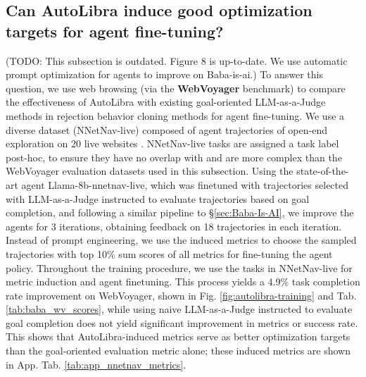 \subsection{Can AutoLibra induce good optimization targets for agent fine-tuning?}
(TODO: This subsection is outdated. Figure 8 is up-to-date. We use automatic prompt optimization for agents to improve on Baba-is-ai.)
\label{sec:webvoyager} To answer this question, we use web browsing (via the \textbf{WebVoyager}
\citep{he2024webvoyager} benchmark) to compare the effectiveness of AutoLibra
with existing goal-oriented LLM-as-a-Judge methods in rejection behavior cloning
methods for agent fine-tuning. We use a diverse dataset (NNetNav-live) composed of
agent trajectories of open-end exploration on 20 live websites \citep{Murty2025NNetNav}.
NNetNav-live tasks are assigned a task label post-hoc, to ensure they have no
overlap with and are more complex than the WebVoyager evaluation datasets used
in this subsection. Using the state-of-the-art agent Llama-8b-nnetnav-live,
which was finetuned with trajectories selected with LLM-as-a-Judge instructed to
evaluate trajectories based on goal completion, and following a similar pipeline
to \S\ref{sec:Baba-Is-AI}, we improve the agents for 3 iterations, obtaining
feedback on 18 trajectories in each iteration. Instead of prompt engineering, we
use the induced metrics to choose the sampled trajectories with top 10\% sum scores
of all metrics for fine-tuning the agent policy. Throughout the training
procedure, we use the tasks in NNetNav-live \citep{Murty2025NNetNav} for metric
induction and agent finetuning. This process yields a 4.9\% task completion rate
improvement on WebVoyager, shown in Fig. \ref{fig:autolibra-training}  and Tab. \ref{tab:baba_wv_scores},
while using naive LLM-as-a-Judge instructed to evaluate goal completion does not
yield significant improvement in metrics or success rate. This shows that AutoLibra-induced
metrics serve as better optimization targets than the goal-oriented evaluation metric
alone; these induced metrics are shown in App. Tab. \ref{tab:app_nnetnav_metrics}.
